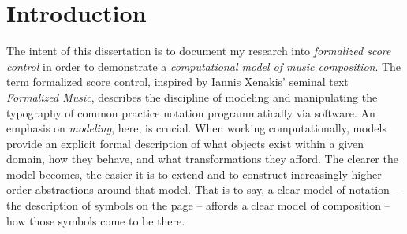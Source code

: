 \chapter{Introduction}
\label{chap:introduction}

The intent of this dissertation is to document my research into
\emph{formalized score control}\citep{ baca2011xi, baca2015tenor,
trevino2013compositional} in order to demonstrate a \emph{computational model
of music composition}. The term formalized score control, inspired by Iannis
Xenakis' seminal text \emph{Formalized Music}\citep{xenakis1992formalized,
baca2012}, describes the discipline of modeling and manipulating the typography
of common practice notation programmatically via software. An emphasis on
\emph{modeling}, here, is crucial. When working computationally, models provide
an explicit formal description of what objects exist within a given domain, how
they behave, and what transformations they afford. The clearer the model
becomes, the easier it is to extend and to construct increasingly higher-order
abstractions around that model. That is to say, a clear model of notation --
the description of symbols on the page -- affords a clear model of composition
-- how those symbols come to be there.

